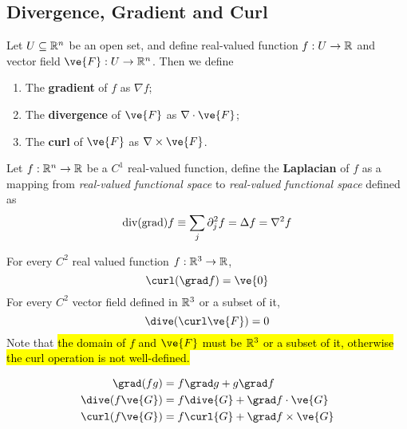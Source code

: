 \documentclass[11pt]{article}
\begin{document}
		\subsection{Divergence, Gradient and Curl}
			\begin{definition}
				Let $U \subseteq \mathbb{R}^n$ be an open set, and define real-valued function $f: U \to \mathbb{R}$ and vector field $\ve{F}: U \to \R^n$. Then we define
				\begin{enumerate}
					\item The \textbf{gradient} of $f$ as $\nabla f$;
					\item The \textbf{divergence} of $\ve{F}$ as $\nabla \cdot \ve{F}$;
					\item The \textbf{curl} of $\ve{F}$ as $\nabla \times \ve{F}$.
				\end{enumerate}
			\end{definition}
			
			\begin{definition}
				Let $f: \mathbb{R}^n \to \mathbb{R}$ be a $C^1$ real-valued function, define the \textbf{Laplacian} of $f$ as a mapping from \emph{real-valued functional space} to \emph{real-valued functional space} defined as
				\begin{equation}
					\text{{div(grad)}} f \equiv \sum_{j} \partial_j^2 f = \Delta f = \nabla^2 f
				\end{equation}
			\end{definition}
			
			\begin{theorem}
				For every $C^2$ real valued function $f: \mathbb{R}^3 \to \mathbb{R}$,
				\begin{equation}
					\curl(\grad f) = \ve{0}
				\end{equation}
				For every $C^2$ vector field defined in $\mathbb{R}^3$ or a subset of it, 
				\begin{equation}
					\dive (\curl \ve{F}) = 0
				\end{equation}
				Note that \hl{the domain of $f$ and $\ve{F}$ must be $\mathbb{R}^3$ or a subset of it, otherwise the curl operation is not well-defined.}\\
			\end{theorem}
			
			\begin{theorem}
				\begin{align}
					\grad (fg) &= f \grad g + g \grad f \\
					\dive (f \ve{G}) &= f \dive{G} + \grad f \cdot \ve{G} \\
					\curl (f \ve{G}) &= f \curl{G} + \grad f \times \ve{G}
				\end{align}
			\end{theorem}
\end{document}
